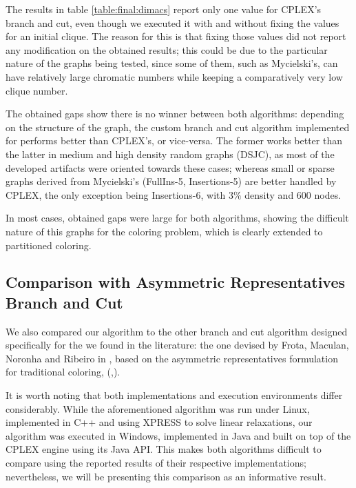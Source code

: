 The results in table \ref{table:final:dimacs} report only one value for \textsc{CPLEX}'s branch and cut, even though we executed it with and without fixing the values for an initial clique. The reason for this is that fixing those values did not report any modification on the obtained results; this could be due to the particular nature of the graphs being tested, since some of them, such as Mycielski's, can have relatively large chromatic numbers while keeping a comparatively very low clique number.

The obtained gaps show there is no winner between both algorithms: depending on the structure of the graph, the custom branch and cut algorithm implemented for \PCP{} performs better than \textsc{CPLEX}'s, or vice-versa. The former works better than the latter in medium and high density random graphs (DSJC), as most of the developed artifacts were oriented towards these cases; whereas small or sparse graphs derived from Mycielski's (FullIns-5, Insertions-5) are better handled by \textsc{CPLEX}, the only exception being Insertions-6, with $3\%$ density and $600$ nodes.

In most cases, obtained gaps were large for both algorithms, showing the difficult nature of this graphs for the coloring problem, which is clearly extended to partitioned coloring.
 
\subsection{Comparison with Asymmetric Representatives Branch and Cut}

We also compared our algorithm to the other branch and cut algorithm designed specifically for the \PCP{} we found in the literature: the one devised by Frota, Maculan, Noronha and Ribeiro in \cite{frota2010branch}, based on the asymmetric representatives formulation for traditional coloring, (\cite{campelo2004cliques},\cite{campelo2008asymmetric}).

It is worth noting that both implementations and execution environments differ considerably. While the aforementioned algorithm was run under Linux, implemented in C++ and  using \textsc{XPRESS} to solve linear relaxations, our algorithm was executed in Windows, implemented in Java and built on top of the \textsc{CPLEX} engine using its Java API. This makes both algorithms difficult to compare using the reported results of their respective implementations; nevertheless, we will be presenting this comparison as an informative result.


